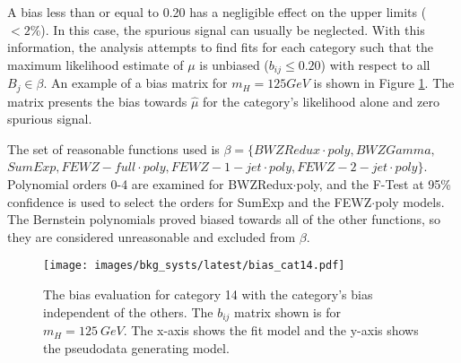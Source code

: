 A bias less than or equal to 0.20 has a negligible effect on the upper limits ($<2\%$). In this case, the spurious signal can usually be neglected. With this information, the analysis attempts to find fits for each category such that the maximum likelihood estimate of $\mu$ is unbiased ($b_{ij} \leq 0.20$) with respect to all $B_j \in \beta$. An example of a bias matrix for $m_H=125 GeV$ is shown in Figure \ref{fig:bias_1}. The matrix presents the bias towards $\hat{\mu}$ for the category's likelihood alone and zero spurious signal. 

The set of reasonable functions used is $\beta = \{BWZRedux\cdot poly, BWZGamma,$ 
$SumExp, FEWZ-full\cdot poly, FEWZ-1-jet\cdot poly, FEWZ-2-jet\cdot poly\}$. Polynomial orders 0-4 are examined for BWZRedux$\cdot$poly, and the F-Test at 95\% confidence is used to select the orders for SumExp and the FEWZ$\cdot$poly models. The Bernstein polynomials proved biased towards all of the other functions, so they are considered unreasonable and excluded from $\beta$. 
\begin{figure}[h!]
    \centering
    \texttt{[image: images/bkg\_systs/latest/bias\_cat14.pdf]}
    \caption[Background bias study on category 14.]
        {The bias evaluation for category 14 with the category's bias independent of the others.
        The $b_{ij}$ matrix shown is for $m_H=125\ GeV$.
        The x-axis shows the fit model and the y-axis shows the pseudodata generating model.}
    \label{fig:bias_1}
\end{figure}
